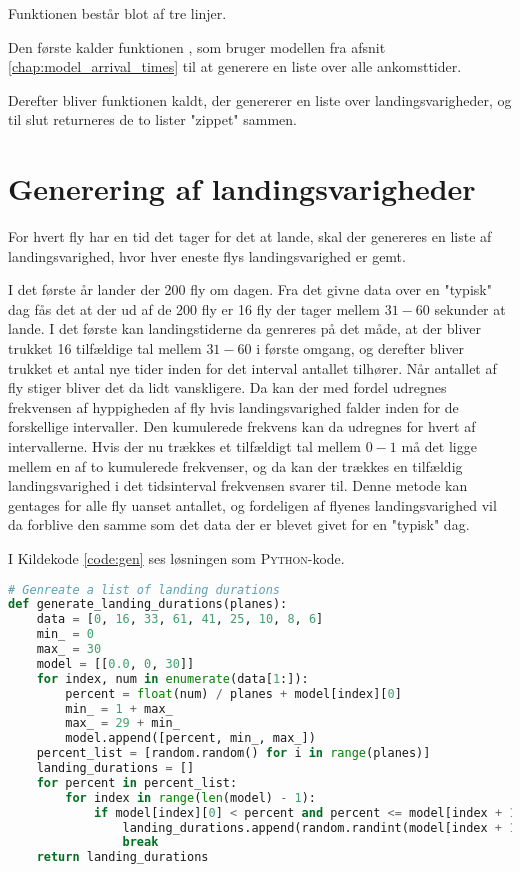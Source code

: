Funktionen  består blot af tre linjer.

Den første kalder funktionen , som bruger modellen fra afsnit \ref{chap:model_arrival_times} til at generere en liste over alle ankomsttider.

Derefter bliver funktionen  kaldt, der genererer en liste over landingsvarigheder, og til slut returneres de to lister "zippet" sammen.

\section{Generering af landingsvarigheder} \label{chap:landing_durations}
For hvert fly har en tid det tager for det at lande, skal der genereres en liste af landingsvarighed, hvor hver eneste flys landingsvarighed er gemt.

I det første år lander der 200 fly om dagen. Fra det givne data over en "typisk" dag fås det at der ud af de 200 fly er 16 fly der tager mellem $31 - 60$ sekunder at lande.
I det første kan landingstiderne da genreres på det måde, at der bliver trukket 16 tilfældige tal mellem $31 - 60$ i første omgang, og derefter bliver trukket et antal nye tider inden for det interval antallet tilhører.
Når antallet af fly stiger bliver det da lidt vanskligere.
Da kan der med fordel udregnes frekvensen af hyppigheden af fly hvis landingsvarighed falder inden for de forskellige intervaller.
Den kumulerede frekvens kan da udregnes for hvert af intervallerne.
Hvis der nu trækkes et tilfældigt tal mellem $0-1$ må det ligge mellem en af to kumulerede frekvenser, og da kan der trækkes en tilfældig landingsvarighed i det tidsinterval frekvensen svarer til.
Denne metode kan gentages for alle fly uanset antallet, og fordeligen af flyenes landingsvarighed vil da forblive den samme som det data der er blevet givet for en "typisk" dag. 

I Kildekode \ref{code:gen} ses løsningen som \textsc{Python}-kode.

\begin{lstlisting}[language=Python, caption={generate\_landing\_durations-funktionen i airplanes.py}, label=code:gen]
# Genreate a list of landing durations
def generate_landing_durations(planes):
    data = [0, 16, 33, 61, 41, 25, 10, 8, 6]
    min_ = 0
    max_ = 30
    model = [[0.0, 0, 30]]
    for index, num in enumerate(data[1:]):
        percent = float(num) / planes + model[index][0]
        min_ = 1 + max_
        max_ = 29 + min_
        model.append([percent, min_, max_])
    percent_list = [random.random() for i in range(planes)]
    landing_durations = []
    for percent in percent_list:
        for index in range(len(model) - 1):
            if model[index][0] < percent and percent <= model[index + 1][0]:
                landing_durations.append(random.randint(model[index + 1][1], model[index + 1][2]))
                break
    return landing_durations
\end{lstlisting}

